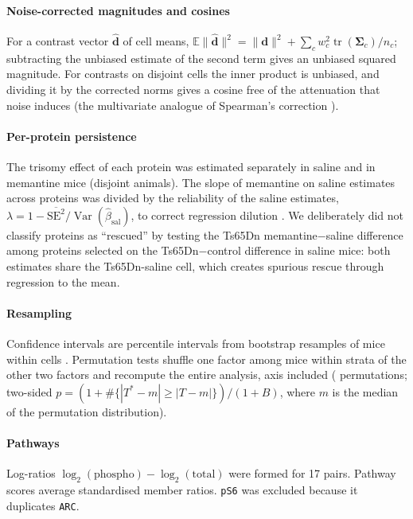 \documentclass[10pt]{article}
\newcommand{\tech}[1]{\texttt{#1}}
\begin{document}
\paragraph{Noise-corrected magnitudes and cosines} For a contrast vector $\hat{\mathbf d}$ of
cell means, $\mathbb E\lVert \hat{\mathbf d}\rVert^2 = \lVert\mathbf d\rVert^2 + \sum_c w_c^2
\operatorname{tr}(\boldsymbol\Sigma_c)/n_c$; subtracting the unbiased estimate of the second
term gives an unbiased squared magnitude. For contrasts on disjoint cells the inner product is
unbiased, and dividing it by the corrected norms gives a cosine free of the attenuation that
noise induces (the multivariate analogue of Spearman's correction \cite{spearman1904}).

\paragraph{Per-protein persistence} The trisomy effect of each protein was estimated separately
in saline and in memantine mice (disjoint animals). The slope of memantine on saline estimates
across proteins was divided by the reliability of the saline estimates, $\lambda = 1 -
\overline{\mathrm{SE}^2}/\operatorname{Var}(\hat\beta_{\mathrm{sal}})$, to correct regression
dilution \cite{fuller1987}. We deliberately did not classify proteins as ``rescued'' by testing
the Ts65Dn memantine$-$saline difference among proteins selected on the Ts65Dn$-$control
difference in saline mice: both estimates share the Ts65Dn-saline cell, which creates spurious
rescue through regression to the mean.

\paragraph{Resampling} Confidence intervals are percentile intervals from \NBoot{} bootstrap
resamples of mice within cells \cite{efron1993}. Permutation tests shuffle one factor among mice
within strata of the other two factors and recompute the entire analysis, axis included
(\NPerm{} permutations; two-sided $p = (1 + \#\{|T^* - m| \ge |T - m|\})/(1 + B)$, where $m$ is the
median of the permutation distribution).

\paragraph{Pathways} Log-ratios $\log_2(\text{phospho}) - \log_2(\text{total})$ were formed for
17 pairs. Pathway scores average standardised member ratios. \tech{pS6} was excluded because it
duplicates \tech{ARC}.
\end{document}
